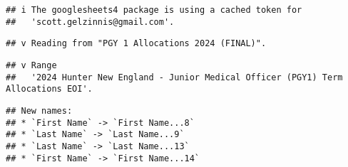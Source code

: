 \documentclass[
]{article}
\begin{document}
\begin{verbatim}
## i The googlesheets4 package is using a cached token for
##   'scott.gelzinnis@gmail.com'.
\end{verbatim}

\begin{verbatim}
## v Reading from "PGY 1 Allocations 2024 (FINAL)".
\end{verbatim}

\begin{verbatim}
## v Range
##   '2024 Hunter New England - Junior Medical Officer (PGY1) Term Allocations EOI'.
\end{verbatim}

\begin{verbatim}
## New names:
## * `First Name` -> `First Name...8`
## * `Last Name` -> `Last Name...9`
## * `Last Name` -> `Last Name...13`
## * `First Name` -> `First Name...14`
\end{verbatim}
\end{document}
